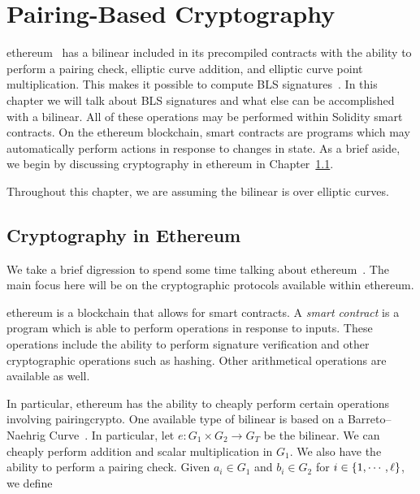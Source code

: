 \chapter{Pairing-Based Cryptography}
\label{chap:pairing}

\Gls{ethereum}~\cite{EthereumYellowpaper} has a \gls{bilinear}
included in its precompiled contracts
with the ability to perform a pairing check, elliptic curve addition,
and elliptic curve point multiplication.
This makes it possible to compute BLS signatures~\cite{BLSSignatures}.
In this chapter we will talk about BLS signatures
and what else can be accomplished with a \gls{bilinear}.
All of these operations may be performed within Solidity
\glspl{smart contract}.
On the \gls{ethereum} blockchain, \glspl{smart contract} are programs
which may automatically perform actions in response
to changes in state.
As a brief aside, we begin by discussing cryptography in \gls{ethereum} in 
Chapter~\ref{sec:pairing_ethereum}.

Throughout this chapter, we are assuming the \gls{bilinear}
is over \glspl{elliptic curve}.



\section{Cryptography in Ethereum}
\label{sec:pairing_ethereum}

We take a brief digression to spend some time talking about
\gls{ethereum}~\cite{EthereumYellowpaper}.
The main focus here will be on the cryptographic protocols
available within \gls{ethereum}.

\Gls{ethereum} is a blockchain that allows for \glspl{smart contract}.
A \emph{\gls{smart contract}} is a program which is able to perform
operations in response to inputs.
These operations include the ability to perform signature verification
and other cryptographic operations such as hashing.
Other arithmetical operations are available as well.

In particular, \gls{ethereum} has the ability to cheaply perform
certain operations involving \gls{pairingcrypto}.
One available type of \gls{bilinear} is based on a
Barreto--Naehrig Curve~\cite{BNCurves2005}.
In particular, let $e:G_{1}\times G_{2}\to G_{T}$ be the \gls{bilinear}.
We can cheaply perform addition and scalar multiplication in $G_{1}$.
We also have the ability to perform a pairing check.
Given $a_{i}\in G_{1}$ and $b_{i}\in G_{2}$ for $i\in\left\{ 1,\cdots,\ell \right\}$,
we define


